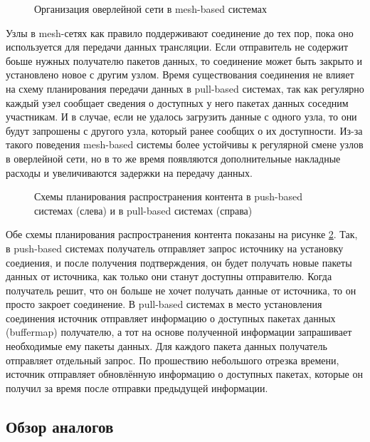 		\begin{figure}[h]
			\caption{Организация оверлейной сети в mesh-based системах}
			\label{img:mesh-based-system}
		\end{figure}

		Узлы в mesh-сетях как правило поддерживают соединение до тех пор, пока оно используется для передачи данных
		трансляции. Если отправитель не содержит боьше нужных получателю пакетов данных, то соединение может быть
		закрыто и установлено новое с другим узлом. Время существования соединения не влияет на схему планирования
		передачи данных в pull-based системах, так как регулярно каждый узел сообщает сведения о доступных у него
		пакетах данных соседним участникам. И в случае, если не удалось загрузить данные с одного узла, то они
		будут запрошены с другого узла, который ранее сообщих о их доступности. Из-за такого поведения mesh-based
		системы более устойчивы к регулярной смене узлов в оверлейной сети, но в то же время появляются дополнительные
		накладные расходы и увеличиваются задержки на передачу данных.

		\begin{figure}[h]
			\caption{Схемы планирования распространения контента в push-based системах (слева) и в pull-based системах
					(справа)}
			\label{img:scheduling-scheme}
		\end{figure}

		Обе схемы планирования распространения контента показаны на рисунке \ref{img:scheduling-scheme}. Так, в
		push-based системах получатель отправляет запрос источнику на установку соедиения, и после получения
		подтверждения, он будет получать новые пакеты данных от источника, как только они станут доступны отправителю.
		Когда получатель решит, что он больше не хочет получать данные от источника, то он просто закроет соединение.
		В pull-based системах в место установления соединения источник отправляет информацию о доступных пакетах данных
		(buffermap) получателю, а тот на основе полученной информации запрашивает необходимые ему пакеты данных. Для
		каждого пакета данных получатель отправляет отдельный запрос. По прошествию небольшого отрезка времени,
		источник отправляет обновлённую информацию о доступных пакетах, которые он получил за время после отправки
		предыдущей информации.

	\subsection{Обзор аналогов}
